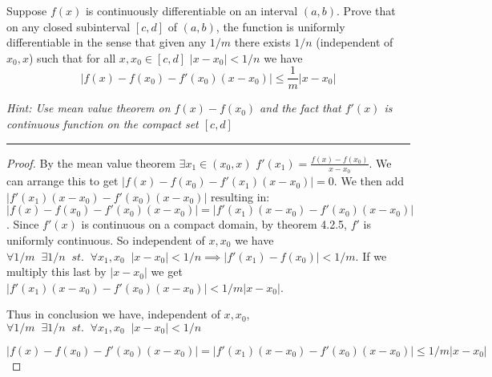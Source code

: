 \documentclass[11pt]{article}
\renewcommand{\sp}{\; \;}
\begin{document}

Suppose $f(x)$ is continuously differentiable on an interval $(a,b)$. Prove that on any closed subinterval $[c,d]$ of $(a,b)$, the function is uniformly differentiable in the sense that given any $1/m$ there exists $1/n$ (independent of $x_0, x$) such that for all $x, x_0 \in [c,d]$ $|x - x_0| < 1/n$ we have
$$|f(x) - f(x_0) - f'(x_0)(x-x_0)| \leq \frac{1}{m} |x - x_0|$$

\textit{Hint: Use mean value theorem on $f(x) - f(x_0)$ and the fact that $f'(x)$ is continuous function on the compact set $[c,d]$}

\hrule

\begin{proof}
 
By the mean value theorem $\exists x_1 \in (x_0, x)$ $f'(x_1) = \frac{f(x) - f(x_0)}{x - x_0}$. 
We can arrange this to get $|f(x) - f(x_0) - f'(x_1)(x - x_0)| = 0$. 
We then add $|f'(x_1)(x - x_0) - f'(x_0)(x - x_0)|$ resulting in: $|f(x) - f(x_0) - f'(x_0)(x - x_0)| = |f'(x_1)(x - x_0) - f'(x_0)(x - x_0)|$.
Since $f'(x)$ is continuous on a compact domain, by theorem 4.2.5, $f'$ is uniformly continuous. So independent of $x, x_0$ we have $\forall 1/m \sp \exists 1/n \sp st. \sp \forall x_1, x_0 \sp |x - x_0| < 1/n \implies |f'(x_1) - f(x_0)| < 1/m$. 
If we multiply this last by $|x - x_0|$ we get $|f'(x_1)(x - x_0) - f'(x_0)(x - x_0)| < 1/m |x - x_0|$.

Thus in conclusion we have, independent of $x, x_0$, $\forall 1/m \sp \exists 1/n \sp st. \sp \forall x_1, x_0 \sp |x - x_0| < 1/n$

$$|f(x) - f(x_0) - f'(x_0)(x - x_0)| = |f'(x_1)(x - x_0) - f'(x_0)(x - x_0)| \leq  1/m |x - x_0|$$



\end{proof}
\end{document}
